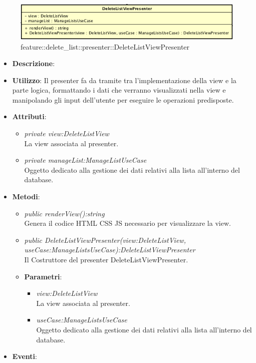 \label{feature::delete_list::presenter::DeleteListViewPresenter}
\begin{figure}[ht]
	\centering
	\includegraphics[scale=0.5]{Sezioni/SottosezioniST/img/app/DeleteListViewPresenter.png}
	\caption{feature::delete\_list::presenter::DeleteListViewPresenter}
\end{figure}

\begin{itemize}
\item \textbf{Descrizione}: 
\item \textbf{Utilizzo}: Il presenter fa da tramite tra l'implementazione della view e la parte logica, formattando i dati che verranno visualizzati nella view e manipolando gli input dell'utente per eseguire le operazioni predisposte.
\item \textbf{Attributi}: 
	\begin{itemize}
	\item \textit{private view:DeleteListView}\\
		La view associata al presenter.
	\item \textit{private manageList:ManageListUseCase}\\
				Oggetto dedicato alla gestione dei dati relativi alla lista all'interno del database.
	\end{itemize}
\item \textbf{Metodi}:
	\begin{itemize}
	\item \textit{public renderView():string}\\
	Genera il codice HTML CSS JS necessario per visualizzare la view.
	\item \textit{public DeleteListViewPresenter(view:DeleteListView, useCase:ManageListsUseCase):DeleteListViewPresenter}\\
	Il Costruttore del presenter DeleteListViewPresenter.
		\item{\textbf{Parametri}: \begin{itemize}
		\item \textit{view:DeleteListView}\\
			La view associata al presenter.
		\item \textit{useCase:ManageListsUseCase}\\
			Oggetto dedicato alla gestione dei dati relativi alla lista all'interno del database.
		\end{itemize}}
	\end{itemize}
\item \textbf{Eventi}:
\end{itemize}